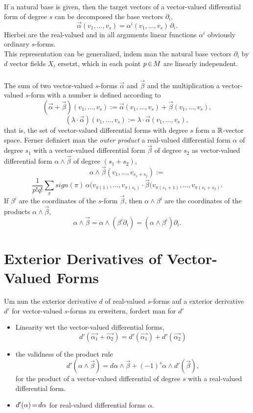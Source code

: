 \documentclass[11pt,twoside]{article}
\begin{document}
\subparagraph{}
If a natural base is given,
then the target vectors of a vector-valued differential form
of degree $s$ can be decomposed {\wrt} the base vectors $\partial_i$,
\[
\vec{\alpha}(v_1,\ldots,v_s) = \alpha^i(v_1,\ldots,v_s) \, \partial_i.
\]
Hierbei are the real-valued and in all arguments linear functions
$\alpha^i$ obviously ordinary $s$-forms.\\
This representation can be generalized,
indem man the natural base vectors $\partial_i$ by $d$ vector fields $X_i$ ersetzt,
which in each point $p {\,\in\,} {M}$ are linearly independent.

\subparagraph{}
The sum of two vector-valued $s$-forms $\vec{\alpha}$ and $\vec{\beta}$
and the multiplication a vector-valued $s$-form with a number
is defined according to
\[
(\vec{\alpha} + \vec{\beta}) (v_1,\ldots,v_s) :=
\vec{\alpha}(v_1,\ldots,v_s) + \vec{\beta}(v_1,\ldots,v_s),
\]
\[
(\lambda \cdot \vec{\alpha}) (v_1,\ldots,v_s) :=
\lambda \cdot \vec{\alpha}(v_1,\ldots,v_s),
\]
that is,
the set of vector-valued differential forms with degree $s$ form
a ${\mathbb{R}}$-vector space.
Ferner definiert man the \textit{outer product} a real-valued
differential form $\alpha$ of degree $s_1$
with a vector-valued differential form $\vec{\beta}$
of degree $s_2$
as vector-valued differential form $\alpha \wedge \vec{\beta}$
of degree $(s_1 + s_2)$,
\[
\alpha \wedge \vec{\beta} (v_1,\ldots,v_{s_1+s_2}) :=
\]
\[
\frac{1}{p! q!} \sum_{\pi} sign(\pi) \,
\alpha(v_{\pi(1)},\ldots,v_{\pi(s_1)} \cdot
\vec{\beta}(v_{\pi(s_1+1)},\ldots,v_{\pi(s_1+s_2)}.
\]
If $\beta^i$ are the coordinates of the $s$-form $\vec{\beta}$,
then $\alpha \wedge \beta^i$ are the coordinates of the products
$\alpha \wedge \vec{\beta}$,
\[
 \alpha \wedge \vec{\beta} = \alpha \wedge (\beta^i \partial_i) =
(\alpha \wedge \beta^i) \partial_i.
\]

\section{Exterior Derivatives of Vector-Valued Forms}
Um nun the exterior derivative $d$ of real-valued $s$-forms
auf a exterior derivative $d'$ for vector-valued $s$-forms
zu erweitern, fordert man for $d'$

\begin{itemize}[leftmargin=15pt]
\item[1.]
Linearity {wrt} the vector-valued differential forms,
\[
d'(\vec{\alpha_1} + \vec{\alpha_2}) =
d'(\vec{\alpha_1}) + d'(\vec{\alpha_2})
\]
\item[2.]
the validness of the product rule
\[
d'(\alpha \wedge \vec{\beta}) = d \alpha \wedge \vec{\beta} +
(-1)^s \alpha \wedge d'(\vec{\beta}),
\]
for the product of a vector-valued differential of degree $s$
with a real-valued differential form.
\item[3.]
$d'(\alpha) {\,=\,} d\alpha$ for real-valued differential forms $\alpha$.
\end{itemize}
\end{document}
